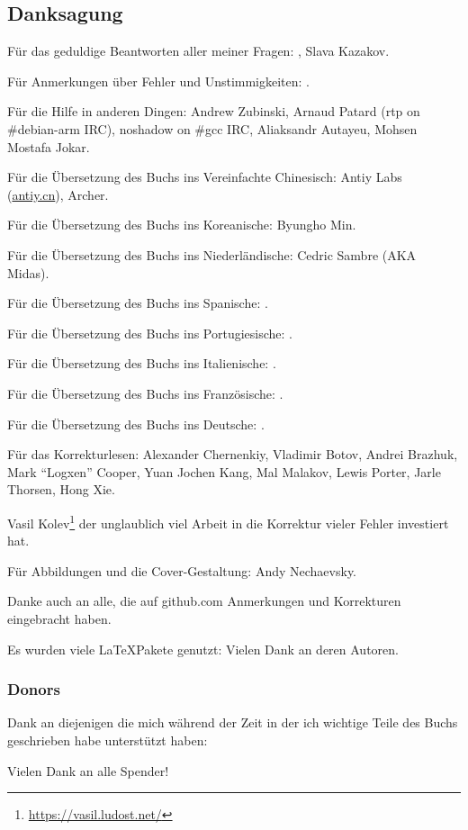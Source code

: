 \subsection*{Danksagung}

Für das geduldige Beantworten aller meiner Fragen: \HERMIT, Slava  Kazakov.

Für Anmerkungen über Fehler und Unstimmigkeiten: \PeopleMistakesInaccuracies{}.

Für die Hilfe in anderen Dingen:
Andrew Zubinski,
Arnaud Patard (rtp on \#debian-arm IRC),
noshadow on \#gcc IRC,
Aliaksandr Autayeu,
Mohsen Mostafa Jokar.

Für die Übersetzung des Buchs ins Vereinfachte Chinesisch:
Antiy Labs (\href{http://antiy.cn}{antiy.cn}), Archer.

Für die Übersetzung des Buchs ins Koreanische: Byungho Min.

Für die Übersetzung des Buchs ins Niederländische: Cedric Sambre (AKA Midas).

Für die Übersetzung des Buchs ins Spanische: \PeopleSpanishTranslators{}.

Für die Übersetzung des Buchs ins Portugiesische: \PeoplePTBRTranslators{}.

Für die Übersetzung des Buchs ins Italienische: \PeopleItalianTranslators{}.

Für die Übersetzung des Buchs ins Französische: \PeopleFrenchTranslators{}.

Für die Übersetzung des Buchs ins Deutsche: \PeopleGermanTranslators{}.

Für das Korrekturlesen:
Alexander  Chernenkiy,
Vladimir Botov,
Andrei Brazhuk,
Mark ``Logxen'' Cooper, Yuan Jochen Kang, Mal Malakov, Lewis Porter, Jarle Thorsen, Hong Xie.

Vasil Kolev\footnote{\url{https://vasil.ludost.net/}} der unglaublich viel Arbeit in die Korrektur vieler Fehler investiert hat.

Für Abbildungen und die Cover-Gestaltung: Andy Nechaevsky.

Danke auch an alle, die auf github.com Anmerkungen und Korrekturen eingebracht haben\FNGithubContributors{}.

Es wurden viele \LaTeX\-Pakete genutzt: Vielen Dank an deren Autoren.

\subsubsection*{Donors}

Dank an diejenigen die mich während der Zeit in der ich wichtige Teile des Buchs geschrieben habe
unterstützt haben:



Vielen Dank an alle Spender!
